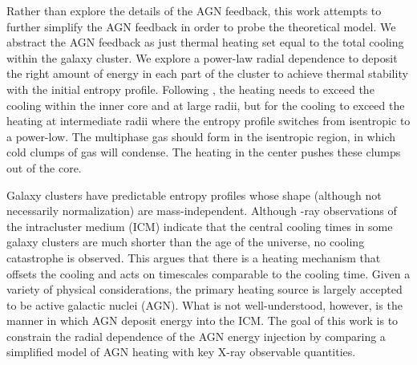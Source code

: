 \documentclass[iop,apjl, twocolappendix]{emulateapj}   %
\begin{document}
Rather than explore the details of the AGN feedback, this work attempts to
further simplify the AGN feedback in order to probe the theoretical model. We
abstract the AGN feedback as just thermal heating set equal to the total
cooling within the galaxy cluster. We explore a power-law radial dependence to
deposit the right amount of energy in each part of the cluster to achieve
thermal stability with the initial entropy profile. Following
\citep{voit_global_2017},  the heating needs to exceed the cooling within the
inner core and at large radii, but for the cooling to exceed the heating at
intermediate radii where the entropy profile switches from isentropic to a
power-low. The multiphase gas should form in the isentropic region, in which
cold clumps of gas will condense. The heating in the center pushes these
clumps out of the core.

Galaxy clusters have predictable entropy profiles whose shape (although not
necessarily normalization) are mass-independent.
\cite{cavagnolo_intracluster_2009} Although -ray observations of the
intracluster medium (ICM) indicate that the central cooling times  in some
galaxy clusters are much shorter than the age of the universe, no cooling
catastrophe is observed. This argues that there is a heating mechanism that
offsets the cooling and acts on timescales comparable to the cooling time.
Given a variety of physical considerations, the primary heating source is
largely accepted to be active galactic nuclei (AGN).  What is not
well-understood, however, is the manner in which AGN deposit energy into the
ICM. The goal of this work is to constrain the radial dependence of
the AGN energy injection by comparing a simplified model of AGN heating with
key X-ray observable quantities. 
\end{document}
